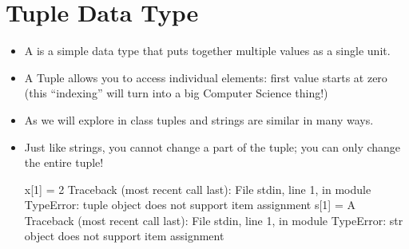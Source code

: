 \documentclass[letterpaper,10pt,english]{sphinxmanual}
\begin{document}
\section{Tuple Data Type}
\label{\detokenize{lecture_notes/lec07_modules_images:tuple-data-type}}\begin{itemize}
\item {} 
A  is a simple data type that puts together multiple values
as a single unit.

\item {} 
A Tuple allows you to access individual elements:
first value starts at zero (this “indexing” will turn into a big
Computer Science thing!)

%
\begin{sphinxVerbatim}[commandchars=\\\{\}]
       
\PYG{p}{[}\PYG{p}{]}
\PYG{p}{[}\PYG{p}{]}
\end{sphinxVerbatim}

\item {} 
As we will explore in class tuples and strings are similar in many
ways.

%
\begin{sphinxVerbatim}[commandchars=\\\{\}]
  
\PYG{p}{[}\PYG{p}{]}
\PYG{p}{[}\PYG{p}{]}
\end{sphinxVerbatim}

\item {} 
Just like strings, you cannot change a part of the tuple; you can
only change the entire tuple!

%
\begin{sphinxVerbatim}[commandchars=\\\{\}]
\PYGZgt{}\PYGZgt{}\PYGZgt{} x[1] = 2
Traceback (most recent call last):
File \PYGZdq{}\PYGZlt{}stdin\PYGZgt{}\PYGZdq{}, line 1, in \PYGZlt{}module\PYGZgt{}
TypeError: \PYGZsq{}tuple\PYGZsq{} object does not support item assignment
\PYGZgt{}\PYGZgt{}\PYGZgt{} s[1] = \PYGZsq{}A\PYGZsq{}
Traceback (most recent call last):
File \PYGZdq{}\PYGZlt{}stdin\PYGZgt{}\PYGZdq{}, line 1, in \PYGZlt{}module\PYGZgt{}
TypeError: \PYGZsq{}str\PYGZsq{} object does not support item assignment
\end{sphinxVerbatim}

\end{itemize}
\end{document}

